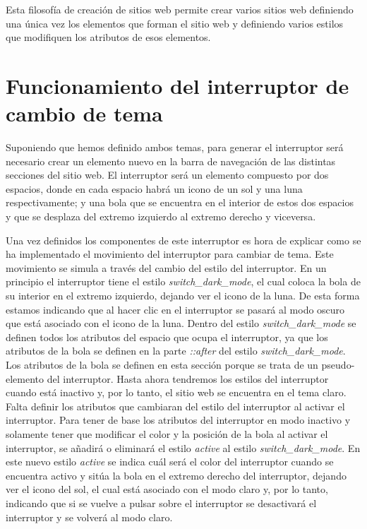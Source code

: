 Esta filosofía de creación de sitios web permite crear varios sitios web definiendo una única vez los elementos que forman el sitio web y definiendo varios estilos que modifiquen los atributos de esos elementos.


\section{Funcionamiento del interruptor de cambio de tema} \label{sec:funcio_interruptor}

Suponiendo que hemos definido ambos temas, para generar el interruptor será necesario crear un elemento nuevo en la barra de navegación de las distintas secciones del sitio web. El interruptor será un elemento compuesto por dos espacios, donde en cada espacio habrá un icono de un sol y una luna respectivamente; y una bola que se encuentra en el interior de estos dos espacios y que se desplaza del extremo izquierdo al extremo derecho y viceversa.

Una vez definidos los componentes de este interruptor es hora de explicar como se ha implementado el movimiento del interruptor para cambiar de tema. Este movimiento se simula a través del cambio del estilo del interruptor. En un principio el interruptor tiene el estilo \textit{switch\_dark\_mode}, el cual coloca la bola de su interior en el extremo izquierdo, dejando ver el icono de la luna. De esta forma estamos indicando que al hacer clic en el interruptor se pasará al modo oscuro que está asociado con el icono de la luna. Dentro del estilo \textit{switch\_dark\_mode} se definen todos los atributos del espacio que ocupa el interruptor, ya que los atributos de la bola se definen en la parte \textit{::after} del estilo \textit{switch\_dark\_mode}. Los atributos de la bola se definen en esta sección porque se trata de un pseudo-elemento del interruptor. Hasta ahora tendremos los estilos del interruptor cuando está inactivo y, por lo tanto, el sitio web se encuentra en el tema claro. Falta definir los atributos que cambiaran del estilo del interruptor al activar el interruptor. Para tener de base los atributos del interruptor en modo inactivo y solamente tener que modificar el color y la posición de la bola al activar el interruptor, se añadirá o eliminará el estilo \textit{active} al estilo \textit{switch\_dark\_mode}. En este nuevo estilo \textit{active} se indica cuál será el color del interruptor cuando se encuentra activo y sitúa la bola en el extremo derecho del interruptor, dejando ver el icono del sol, el cual está asociado con el modo claro y, por lo tanto, indicando que si se vuelve a pulsar sobre el interruptor se desactivará el interruptor y se volverá al modo claro.

